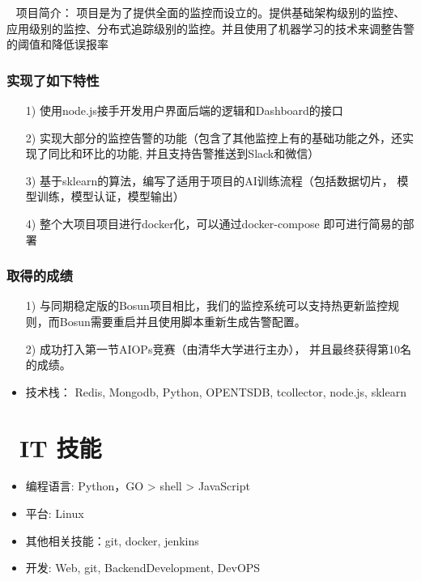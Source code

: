 \documentclass{resume}
\begin{document}
 \textperiodcentered\ 
项目简介： 项目是为了提供全面的监控而设立的。提供基础架构级别的监控、应用级别的监控、分布式追踪级别的监控。并且使用了机器学习的技术来调整告警的阈值和降低误报率
    \subsubsection{\textbf {实现了如下特性}}
    \begin{itemize}
        \item [1)]
            使用node.js接手开发用户界面后端的逻辑和Dashboard的接口
        \item [2)]
            实现大部分的监控告警的功能（包含了其他监控上有的基础功能之外，还实现了同比和环比的功能, 并且支持告警推送到Slack和微信）
        \item [3)]   
            基于sklearn的算法，编写了适用于项目的AI训练流程（包括数据切片， 模型训练，模型认证，模型输出） 
        \item [4)] 
            整个大项目项目进行docker化，可以通过docker-compose 即可进行简易的部署
    \end{itemize}
    \subsubsection{\textbf {取得的成绩}}
    \begin{itemize}
        \item [1)]
            与同期稳定版的Bosun项目相比，我们的监控系统可以支持热更新监控规则，而Bosun需要重启并且使用脚本重新生成告警配置。
        \item [2)] 
            成功打入第一节AIOPs竞赛（由清华大学进行主办）， 并且最终获得第10名的成绩。
    \end{itemize}
    \begin{itemize}
    \item 技术栈： Redis, Mongodb, Python, OPENTSDB, tcollector, node.js, sklearn
    \end{itemize}

\section{\faCogs\ IT 技能}
\begin{itemize}[parsep=0.5ex]
  \item 编程语言: Python，GO > shell > JavaScript
  \item 平台: Linux
  \item 其他相关技能：git, docker, jenkins
  \item 开发: Web, git, BackendDevelopment, DevOPS
\end{itemize}
\end{document}
